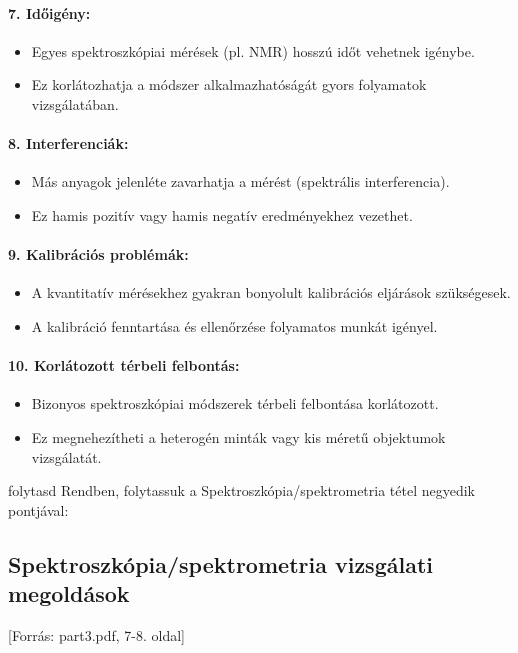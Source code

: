 \documentclass[a4paper,12pt]{article}
\begin{document}
\paragraph{7. Időigény:} \begin{itemize} \item Egyes spektroszkópiai mérések (pl. NMR) hosszú időt vehetnek igénybe. \item Ez korlátozhatja a módszer alkalmazhatóságát gyors folyamatok vizsgálatában. \end{itemize}

\paragraph{8. Interferenciák:} \begin{itemize} \item Más anyagok jelenléte zavarhatja a mérést (spektrális interferencia). \item Ez hamis pozitív vagy hamis negatív eredményekhez vezethet. \end{itemize}

\paragraph{9. Kalibrációs problémák:} \begin{itemize} \item A kvantitatív mérésekhez gyakran bonyolult kalibrációs eljárások szükségesek. \item A kalibráció fenntartása és ellenőrzése folyamatos munkát igényel. \end{itemize}

\paragraph{10. Korlátozott térbeli felbontás:} \begin{itemize} \item Bizonyos spektroszkópiai módszerek térbeli felbontása korlátozott. \item Ez megnehezítheti a heterogén minták vagy kis méretű objektumok vizsgálatát. \end{itemize}

folytasd
Rendben, folytassuk a Spektroszkópia/spektrometria tétel negyedik pontjával:

\subsection{Spektroszkópia/spektrometria vizsgálati megoldások} [Forrás: part3.pdf, 7-8. oldal]
\end{document}
